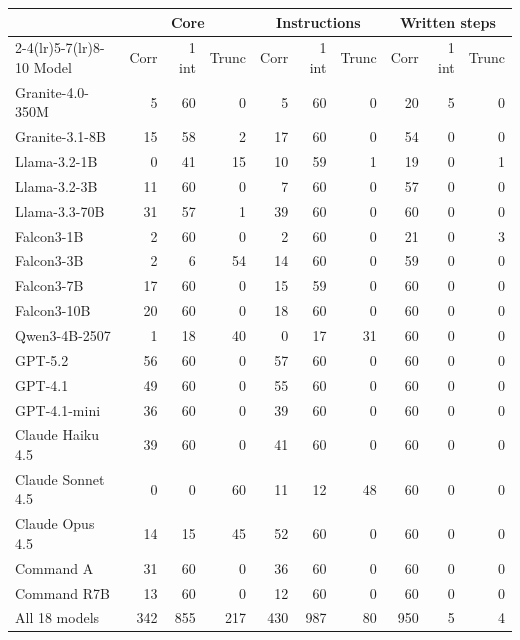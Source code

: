 \begin{table}[t]
\centering
\footnotesize
\setlength{\tabcolsep}{3pt}
\begin{tabular}{lrrrrrrrrr}
\toprule
 & \multicolumn{3}{c}{Core} & \multicolumn{3}{c}{Instructions} & \multicolumn{3}{c}{Written steps} \\
\cmidrule(lr){2-4}\cmidrule(lr){5-7}\cmidrule(lr){8-10}
Model & Corr & 1 int & Trunc & Corr & 1 int & Trunc & Corr & 1 int & Trunc \\
\midrule
Granite-4.0-350M & 5 & 60 & 0 & 5 & 60 & 0 & 20 & 5 & 0 \\
Granite-3.1-8B & 15 & 58 & 2 & 17 & 60 & 0 & 54 & 0 & 0 \\
Llama-3.2-1B & 0 & 41 & 15 & 10 & 59 & 1 & 19 & 0 & 1 \\
Llama-3.2-3B & 11 & 60 & 0 & 7 & 60 & 0 & 57 & 0 & 0 \\
Llama-3.3-70B & 31 & 57 & 1 & 39 & 60 & 0 & 60 & 0 & 0 \\
Falcon3-1B & 2 & 60 & 0 & 2 & 60 & 0 & 21 & 0 & 3 \\
Falcon3-3B & 2 & 6 & 54 & 14 & 60 & 0 & 59 & 0 & 0 \\
Falcon3-7B & 17 & 60 & 0 & 15 & 59 & 0 & 60 & 0 & 0 \\
Falcon3-10B & 20 & 60 & 0 & 18 & 60 & 0 & 60 & 0 & 0 \\
Qwen3-4B-2507 & 1 & 18 & 40 & 0 & 17 & 31 & 60 & 0 & 0 \\
GPT-5.2 & 56 & 60 & 0 & 57 & 60 & 0 & 60 & 0 & 0 \\
GPT-4.1 & 49 & 60 & 0 & 55 & 60 & 0 & 60 & 0 & 0 \\
GPT-4.1-mini & 36 & 60 & 0 & 39 & 60 & 0 & 60 & 0 & 0 \\
Claude Haiku 4.5 & 39 & 60 & 0 & 41 & 60 & 0 & 60 & 0 & 0 \\
Claude Sonnet 4.5 & 0 & 0 & 60 & 11 & 12 & 48 & 60 & 0 & 0 \\
Claude Opus 4.5 & 14 & 15 & 45 & 52 & 60 & 0 & 60 & 0 & 0 \\
Command A & 31 & 60 & 0 & 36 & 60 & 0 & 60 & 0 & 0 \\
Command R7B & 13 & 60 & 0 & 12 & 60 & 0 & 60 & 0 & 0 \\
\midrule All 18 models & 342 & 855 & 217 & 430 & 987 & 80 & 950 & 5 & 4 \\
\bottomrule
\end{tabular}

\end{table}
